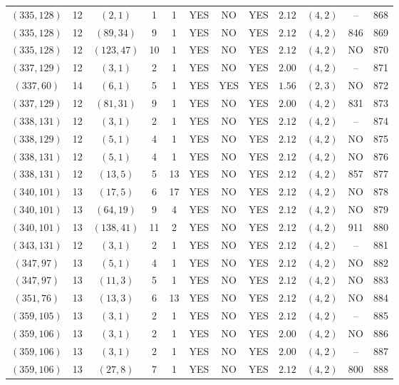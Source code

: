 \begin{longtable}{|c|c|c|c|c|c|c|c|c|c|c|c|}
$(335,128)$ & 12 & $(2,1)$ & 1 & 1 & YES & NO & YES & $2.12$ & $(4,2)$ & -- & 868\\
$(335,128)$ & 12 & $(89,34)$ & 9 & 1 & YES & NO & YES & $2.12$ & $(4,2)$ & 846 & 869\\
$(335,128)$ & 12 & $(123,47)$ & 10 & 1 & YES & NO & YES & $2.12$ & $(4,2)$ & NO & 870\\
$(337,129)$ & 12 & $(3,1)$ & 2 & 1 & YES & NO & YES & $2.00$ & $(4,2)$ & -- & 871\\
$(337,60)$ & 14 & $(6,1)$ & 5 & 1 & YES & YES & YES & $1.56$ & $(2,3)$ & NO & 872\\
$(337,129)$ & 12 & $(81,31)$ & 9 & 1 & YES & NO & YES & $2.00$ & $(4,2)$ & 831 & 873\\
$(338,131)$ & 12 & $(3,1)$ & 2 & 1 & YES & NO & YES & $2.12$ & $(4,2)$ & -- & 874\\
$(338,129)$ & 12 & $(5,1)$ & 4 & 1 & YES & NO & YES & $2.12$ & $(4,2)$ & NO & 875\\
$(338,131)$ & 12 & $(5,1)$ & 4 & 1 & YES & NO & YES & $2.12$ & $(4,2)$ & NO & 876\\
$(338,131)$ & 12 & $(13,5)$ & 5 & 13 & YES & NO & YES & $2.12$ & $(4,2)$ & 857 & 877\\
$(340,101)$ & 13 & $(17,5)$ & 6 & 17 & YES & NO & YES & $2.12$ & $(4,2)$ & NO & 878\\
$(340,101)$ & 13 & $(64,19)$ & 9 & 4 & YES & NO & YES & $2.12$ & $(4,2)$ & NO & 879\\
$(340,101)$ & 13 & $(138,41)$ & 11 & 2 & YES & NO & YES & $2.12$ & $(4,2)$ & 911 & 880\\
$(343,131)$ & 12 & $(3,1)$ & 2 & 1 & YES & NO & YES & $2.12$ & $(4,2)$ & -- & 881\\
$(347,97)$ & 13 & $(5,1)$ & 4 & 1 & YES & NO & YES & $2.12$ & $(4,2)$ & NO & 882\\
$(347,97)$ & 13 & $(11,3)$ & 5 & 1 & YES & NO & YES & $2.12$ & $(4,2)$ & NO & 883\\
$(351,76)$ & 13 & $(13,3)$ & 6 & 13 & YES & NO & YES & $2.12$ & $(4,2)$ & NO & 884\\
$(359,105)$ & 13 & $(3,1)$ & 2 & 1 & YES & NO & YES & $2.12$ & $(4,2)$ & -- & 885\\
$(359,106)$ & 13 & $(3,1)$ & 2 & 1 & YES & NO & YES & $2.00$ & $(4,2)$ & NO & 886\\
$(359,106)$ & 13 & $(3,1)$ & 2 & 1 & YES & NO & YES & $2.00$ & $(4,2)$ & -- & 887\\
$(359,106)$ & 13 & $(27,8)$ & 7 & 1 & YES & NO & YES & $2.12$ & $(4,2)$ & 800 & 888\\

\end{longtable}
